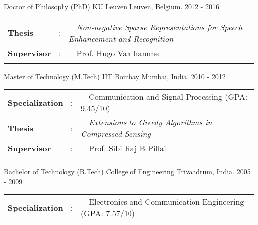 \documentclass[]{awesome-cv}
\begin{document}
\begin{cventries}
	\cventry
	{Doctor of Philosophy (PhD)}
	{KU Leuven}
	{Leuven, Belgium.}
        {2012 - 2016}
	{\begin{tabular}{l c l}
		\textbf{Thesis} & : & ~~\textit{Non-negative Sparse Representations for Speech Enhancement and Recognition}\\
		\textbf{Supervisor} & : & ~~Prof. Hugo Van hamme \\
		& & \\
	 \end{tabular}
	}
	\cventry
	{Master of Technology (M.Tech)}
	{IIT Bombay}
	{Mumbai, India.}
	{2010 - 2012}
	{\begin{tabular}{l c l}
		\textbf{Specialization} & : & ~~Communication and Signal Processing (GPA: 9.45/10) \\
		\textbf{Thesis} & : & ~~\textit{Extensions to Greedy Algorithms in Compressed Sensing}\\
		\textbf{Supervisor} & : & ~~Prof. Sibi Raj B Pillai \\
		& & \\
	 \end{tabular}
	}
	\cventry
	{Bachelor of Technology (B.Tech)}
	{College of Engineering}
	{Trivandrum, India.}
	{2005 - 2009}
	{\begin{tabular}{l c l}
		\textbf{Specialization} & : & ~~Electronics and Communication Engineering (GPA: 7.57/10) \\
	 \end{tabular}
	}
\end{cventries}

\pagebreak

\end{document}
